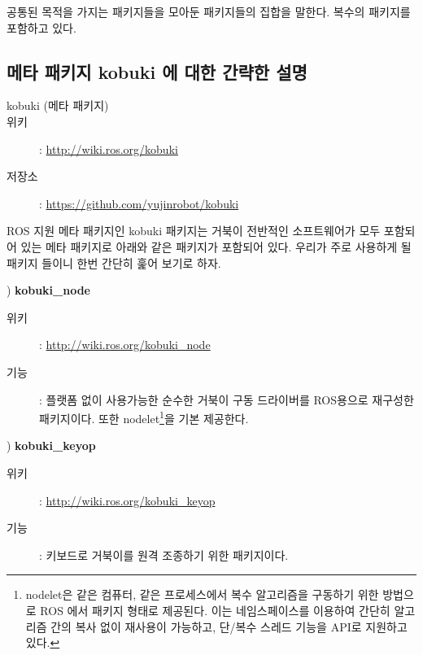 \begin{definition}
공통된 목적을 가지는 패키지들을 모아둔 패키지들의 집합을 말한다. 복수의 패키지를 포함하고 있다.
\end{definition}

\subsection{메타 패키지 kobuki 에 대한 간략한 설명}

\vspace{\baselineskip}
\begin{description}
\item[kobuki (메타 패키지)]
\item[위키]: \url{http://wiki.ros.org/kobuki}
\item[저장소]: \url{https://github.com/yujinrobot/kobuki}
\end{description}

\vspace{\baselineskip}
\noindent
ROS 지원 메타 패키지인 kobuki 패키지는 거북이 전반적인 소프트웨어가 모두 포함되어 있는 메타 패키지로 아래와 같은 패키지가 포함되어 있다. 우리가 주로 사용하게 될 패키지 들이니 한번 간단히 훑어 보기로 하자.

\setcounter{num}{0}

\vspace{\baselineskip}
\noindent{}
\thenum) \textbf{kobuki\_node}
\begin{description}
\item[위키]: \url{http://wiki.ros.org/kobuki_node}
\item[기능]: 플랫폼 없이 사용가능한 순수한 거북이 구동 드라이버를 ROS용으로 재구성한 패키지이다. 또한 nodelet\footnote{nodelet은 같은 컴퓨터, 같은 프로세스에서 복수 알고리즘을 구동하기 위한 방법으로 ROS 에서 패키지 형태로 제공된다. 이는 네임스페이스를 이용하여 간단히 알고리즘 간의 복사 없이 재사용이 가능하고, 단/복수 스레드 기능을 API로 지원하고 있다.}을 기본 제공한다.
\end{description}

\vspace{\baselineskip}
\noindent{}
\thenum) \textbf{kobuki\_keyop}
\begin{description}
\item[위키]: \url{http://wiki.ros.org/kobuki_keyop}
\item[기능]: 키보드로 거북이를 원격 조종하기 위한 패키지이다.
\end{description}

